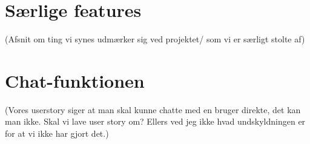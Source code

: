 	
\section{Særlige features}
(Afsnit om ting vi synes udmærker sig ved projektet/ som vi er særligt stolte af)

\section{Chat-funktionen}
(Vores userstory siger at man skal kunne chatte med en bruger direkte, det kan man ikke. Skal vi lave user story om? Ellers  ved jeg ikke hvad undskyldningen er for at vi ikke har gjort det.)
